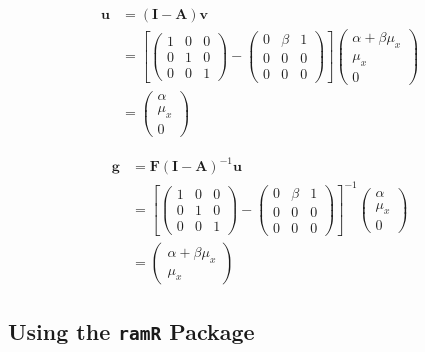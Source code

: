 \documentclass[
]{book}
\theoremstyle{definition}
\theoremstyle{definition}
\theoremstyle{definition}
\theoremstyle{remark}
\begin{document}
\begin{align*}\mathbf{u} &=\left( \mathbf{I} - \mathbf{A} \right) \mathbf{v}\\ &=\left[\left( \begin{array}{ccc} 1 & 0 & 0 \\ 0 & 1 & 0 \\ 0 & 0 & 1 \end{array} \right)-\left( \begin{array}{ccc} 0 & \beta  & 1 \\ 0 & 0 & 0 \\ 0 & 0 & 0 \end{array} \right)\right]\left( \begin{array}{c} \alpha  + \beta  \mu  _{x} \\ \mu  _{x} \\ 0 \end{array} \right)\\ &=\left( \begin{array}{c} \alpha  \\ \mu  _{x} \\ 0 \end{array} \right)\end{align*}

\begin{align*}\mathbf{g} &=\mathbf{F} \left( \mathbf{I} - \mathbf{A} \right)^{-1} \mathbf{u}\\ &=\left[\left( \begin{array}{ccc} 1 & 0 & 0 \\ 0 & 1 & 0 \\ 0 & 0 & 1 \end{array} \right)-\left( \begin{array}{ccc} 0 & \beta  & 1 \\ 0 & 0 & 0 \\ 0 & 0 & 0 \end{array} \right)\right]^{-1}\left( \begin{array}{c} \alpha  \\ \mu  _{x} \\ 0 \end{array} \right)\\ &=\left( \begin{array}{c} \alpha  + \beta  \mu  _{x} \\ \mu  _{x} \end{array} \right)\end{align*}

\hypertarget{using-the-ramr-package}{%
\subsection{\texorpdfstring{Using the \texttt{ramR} Package}{Using the ramR Package}}\label{using-the-ramr-package}}
\end{document}
